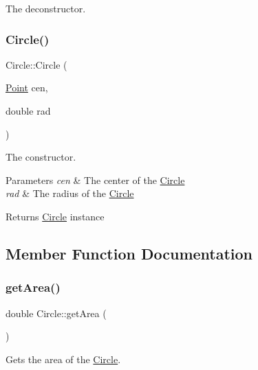 The deconstructor. 

\mbox{\label{class_circle_ac6202983dbc02af4cbb80b466c657a52}} 
\subsubsection{\texorpdfstring{Circle()}{Circle()}}
{\footnotesize\ttfamily Circle\+::\+Circle (\begin{DoxyParamCaption}\item[{\mbox{\hyperlink{class_point}{Point}}}]{cen,  }\item[{double}]{rad }\end{DoxyParamCaption})}



The constructor. 


\begin{DoxyParams}{Parameters}
{\em cen} & The center of the \mbox{\hyperlink{class_circle}{Circle}} \\
\hline
{\em rad} & The radius of the \mbox{\hyperlink{class_circle}{Circle}} \\
\hline
\end{DoxyParams}
\begin{DoxyReturn}{Returns}
\mbox{\hyperlink{class_circle}{Circle}} instance 
\end{DoxyReturn}


\subsection{Member Function Documentation}
\mbox{\label{class_circle_a99fe1cbabbf3a9ccae51832376c5e8d4}} 
\subsubsection{\texorpdfstring{getArea()}{getArea()}}
{\footnotesize\ttfamily double Circle\+::get\+Area (\begin{DoxyParamCaption}{ }\end{DoxyParamCaption})\hspace{0.3cm}{\ttfamily [virtual]}}



Gets the area of the \mbox{\hyperlink{class_circle}{Circle}}. 

